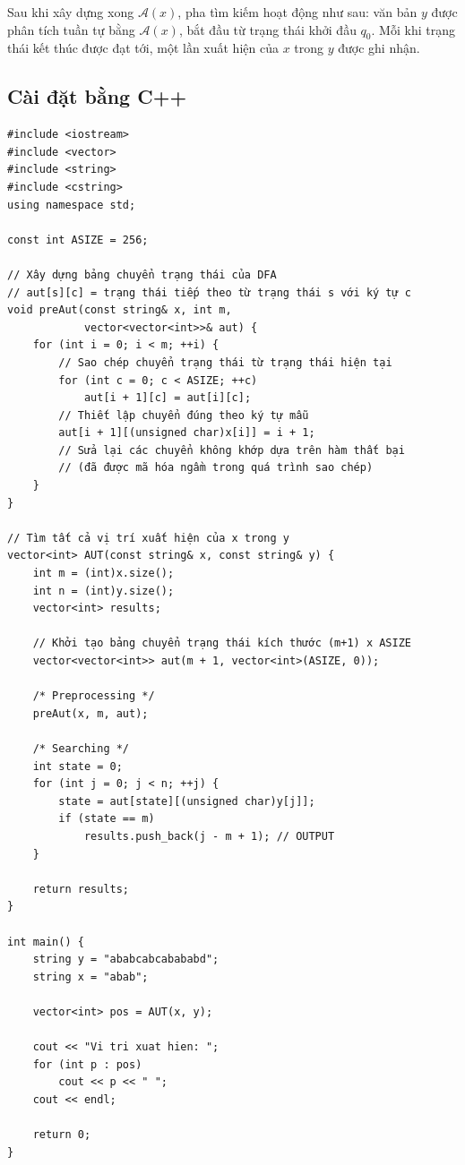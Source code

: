 Sau khi xây dựng xong $\mathcal{A}(x)$, pha tìm kiếm hoạt động như sau:
văn bản $y$ được phân tích tuần tự bằng $\mathcal{A}(x)$, bắt đầu từ
trạng thái khởi đầu $q_0$. Mỗi khi trạng thái kết thúc được đạt tới,
một lần xuất hiện của $x$ trong $y$ được ghi nhận.

\subsection{Cài đặt bằng C++}

\begin{verbatim}
#include <iostream>
#include <vector>
#include <string>
#include <cstring>
using namespace std;

const int ASIZE = 256;

// Xây dựng bảng chuyển trạng thái của DFA
// aut[s][c] = trạng thái tiếp theo từ trạng thái s với ký tự c
void preAut(const string& x, int m,
            vector<vector<int>>& aut) {
    for (int i = 0; i < m; ++i) {
        // Sao chép chuyển trạng thái từ trạng thái hiện tại
        for (int c = 0; c < ASIZE; ++c)
            aut[i + 1][c] = aut[i][c];
        // Thiết lập chuyển đúng theo ký tự mẫu
        aut[i + 1][(unsigned char)x[i]] = i + 1;
        // Sửa lại các chuyển không khớp dựa trên hàm thất bại
        // (đã được mã hóa ngầm trong quá trình sao chép)
    }
}

// Tìm tất cả vị trí xuất hiện của x trong y
vector<int> AUT(const string& x, const string& y) {
    int m = (int)x.size();
    int n = (int)y.size();
    vector<int> results;

    // Khởi tạo bảng chuyển trạng thái kích thước (m+1) x ASIZE
    vector<vector<int>> aut(m + 1, vector<int>(ASIZE, 0));

    /* Preprocessing */
    preAut(x, m, aut);

    /* Searching */
    int state = 0;
    for (int j = 0; j < n; ++j) {
        state = aut[state][(unsigned char)y[j]];
        if (state == m)
            results.push_back(j - m + 1); // OUTPUT
    }

    return results;
}

int main() {
    string y = "ababcabcabababd";
    string x = "abab";

    vector<int> pos = AUT(x, y);

    cout << "Vi tri xuat hien: ";
    for (int p : pos)
        cout << p << " ";
    cout << endl;

    return 0;
}
\end{verbatim}

